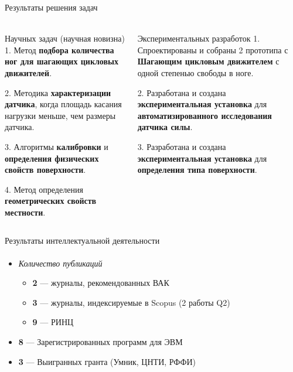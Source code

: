 \documentclass[aspectratio=169,xcolor=table]{beamer}
\begin{document}
\begin{frame}[t]{Результаты решения задач}
    \framesubtitle{}
    \vspace{-0.7cm}
    \begin{columns}[T,onlytextwidth]
        \begin{column}{0.48\textwidth}
            \begin{block}{Научных задач (научная новизна)}
                1. Метод \textbf{подбора количества ног для шагающих цикловых движителей}.

                2. Методика \textbf{характеризации датчика}, когда площадь касания нагрузки меньше, чем размеры датчика.

                3. Алгоритмы \textbf{калибровки} и \textbf{определения физических свойств поверхности}.

                4. Метод определения \textbf{геометрических свойств местности}.

            \end{block}
        \end{column}
        \begin{column}{0.48\textwidth}
            \begin{alertblock}{Экспериментальных разработок}
                1. Спроектированы и собраны 2 прототипа с \textbf{Шагающим цикловым движителем} с одной степенью свободы в ноге.

                2. Разработана и создана \textbf{экспериментальная установка} для \textbf{автоматизированного исследования датчика силы}.

                3. Разработана и создана \textbf{экспериментальная установка} для \textbf{определения типа поверхности}.

            \end{alertblock}
        \end{column}
    \end{columns}
\end{frame}

\begin{frame}[t]{Результаты интеллектуальной деятельности}
    \framesubtitle{}
    \large
    \begin{itemize}
        \item \textit{Количество публикаций}
              \begin{itemize}
                  \large
                  \item \textbf{2} --- журналы, рекомендованных ВАК
                  \item \textbf{3} --- журналы, индексируемые в Scopus (2 работы Q2)
                  \item \textbf{9} --- РИНЦ
              \end{itemize}
        \item \textbf{8} --- Зарегистрированных программ для ЭВМ
        \item \textbf{3} --- Выигранных гранта (Умник, ЦНТИ, РФФИ)
    \end{itemize}
\end{frame}
\end{document}

